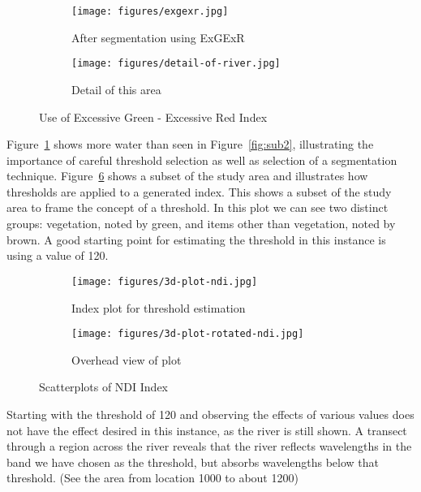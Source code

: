 \documentclass[letterpaper]{article}
\begin{document}
{\begin{figure}[H]
  \centering
  \begin{subfigure}{.32\textwidth}
  	\centering
  	\texttt{[image: figures/exgexr.jpg]}
  	\caption{After segmentation using ExGExR}
  	\label{fig:exgexr-overview}
  \end{subfigure}
  \begin{subfigure}{.32\textwidth}
  	\centering
  	\texttt{[image: figures/detail-of-river.jpg]}
  	\caption{Detail of this area}
  	\label{fig:exgexr-detail}
  \end{subfigure}
  \caption{Use of Excessive Green - Excessive Red Index}
  \label{fig:exgexr}
\end{figure}

Figure~\ref{fig:exgexr-overview} shows more water than seen in Figure~\ref{fig:sub2}, illustrating the importance of careful threshold selection as well as selection of a segmentation technique.  Figure~\ref{fig:index-plot-3d} shows a subset of the study area and illustrates how thresholds are applied to a generated index. This shows a subset of the study area to frame the concept of a threshold. In this plot we can see two distinct groups: vegetation, noted by green, and items other than vegetation, noted by brown. A good starting point for estimating the threshold in this instance is using a value of 120.

\begin{figure}[H]
\centering
    \begin{subfigure}{.40\textwidth}
  	\centering
  	\texttt{[image: figures/3d-plot-ndi.jpg]}
  	\caption{Index plot for threshold estimation}
  	\label{fig:exgexr-3d-oblique}
  \end{subfigure}
  \begin{subfigure}{.40\textwidth}
  	\centering
  	\texttt{[image: figures/3d-plot-rotated-ndi.jpg]}
  	\caption{Overhead view of plot}
  	\label{fig:exgexr-overhead}
  \end{subfigure} 
  \caption{Scatterplots of NDI Index}
  \label{fig:index-plot-3d}
\end{figure}

Starting with the threshold of 120 and observing the effects of various values does not have the effect desired in this instance, as the river is still shown.  A transect through a region across the river reveals that the river reflects wavelengths in the band we have chosen as the threshold, but absorbs wavelengths below that threshold.  (See the area from location 1000 to about 1200)

}
\end{document}
